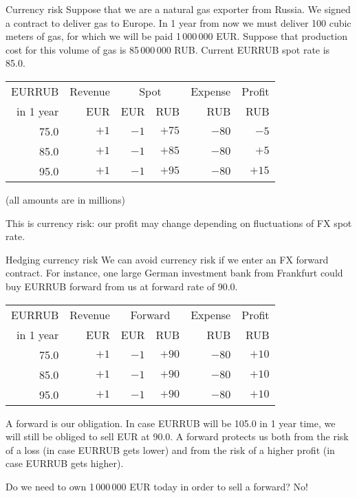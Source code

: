 \documentclass{beamer}
\begin{document}
\begin{frame}{Currency risk}
\justify
Suppose that we are a natural gas exporter from Russia. We signed a contract to deliver gas to Europe. In 1 year from now we must deliver 100 cubic meters of gas, for which we will be paid 1\,000\,000 EUR. Suppose that production cost for this volume of gas
is 85\,000\,000 RUB. Current EURRUB spot rate is 85.0.

\justify
\centering
\begin{tabular}{r|r|r|r|r|r}
EURRUB      & Revenue & \multicolumn{2}{c|}{Spot} & Expense & Profit \\
\cline{3-4}
in 1 year   & EUR   & EUR   & RUB & RUB & RUB \\ \hline
75.0        & $+1$  & $-1$ & $+75$         & $-80$  & $-5$ \\
85.0        & $+1$ & $-1$ & $+85$         & $-80$  & $+5$ \\
95.0        & $+1$ & $-1$ & $+95$          & $-80$ & $+15$ 
\end{tabular}

(all amounts are in millions)

\justify
This is \alert{currency risk}: our profit may change depending on fluctuations of FX spot rate.
\end{frame}



\begin{frame}{Hedging currency risk}
\justify
We can avoid currency risk if we enter an FX forward contract. For instance, one large German investment bank from Frankfurt
could buy EURRUB forward from us at forward rate of 90.0.

\justify
\centering
\begin{tabular}{r|r|r|r|r|r}
EURRUB      & Revenue & \multicolumn{2}{c|}{Forward} & Expense & Profit \\
\cline{3-4}
in 1 year   & EUR     & EUR    & RUB              & RUB     & RUB   \\ \hline
75.0        & $+1$  & $-1$ & $+90$  & $-80$ & $+10$  \\
85.0        & $+1$  & $-1$ & $+90$  & $-80$ & $+10$  \\
95.0        & $+1$  & $-1$ & $+90$  & $-80$ & $+10$ 
\end{tabular}

\justify
A forward is our obligation. In case EURRUB will be 105.0 in 1 year time, we will still be obliged to sell EUR at 90.0. A forward protects us both from the risk of a loss (in case EURRUB gets lower) and from the risk of a higher profit (in case EURRUB gets higher).

\justify
Do we need to own 1\,000\,000 EUR today in order to sell a forward? No!
\end{frame}
\end{document}

